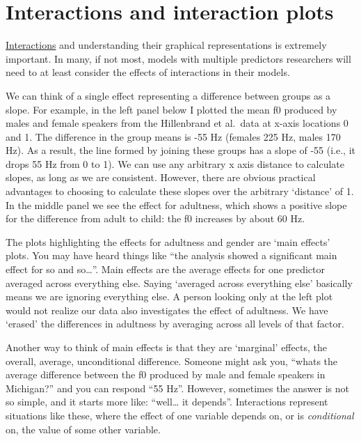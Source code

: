 \documentclass[
]{book}
\begin{document}
\hypertarget{interactions-and-interaction-plots}{%
\section{Interactions and interaction plots}\label{interactions-and-interaction-plots}}

\href{http://glimo.vub.ac.be/downloads/interaction.htm}{Interactions} and understanding their graphical representations is extremely important. In many, if not most, models with multiple predictors researchers will need to at least consider the effects of interactions in their models.

We can think of a single effect representing a difference between groups as a slope. For example, in the left panel below I plotted the mean f0 produced by males and female speakers from the Hillenbrand et al.~data at x-axis locations 0 and 1. The difference in the group means is -55 Hz (females 225 Hz, males 170 Hz). As a result, the line formed by joining these groups has a slope of -55 (i.e., it drops 55 Hz from 0 to 1). We can use any arbitrary x axis distance to calculate slopes, as long as we are consistent. However, there are obvious practical advantages to choosing to calculate these slopes over the arbitrary `distance' of 1. In the middle panel we see the effect for adultness, which shows a positive slope for the difference from adult to child: the f0 increases by about 60 Hz.

The plots highlighting the effects for adultness and gender are `main effects' plots. You may have heard things like ``the analysis showed a significant main effect for so and so\ldots{}''. Main effects are the average effects for one predictor averaged across everything else. Saying `averaged across everything else' basically means we are ignoring everything else. A person looking only at the left plot would not realize our data also investigates the effect of adultness. We have `erased' the differences in adultness by averaging across all levels of that factor.

Another way to think of main effects is that they are `marginal' effects, the overall, average, unconditional difference. Someone might ask you, ``whats the average difference between the f0 produced by male and female speakers in Michigan?'' and you can respond ``55 Hz''. However, sometimes the answer is not so simple, and it starts more like: ``well\ldots{} it depends''. Interactions represent situations like these, where the effect of one variable depends on, or is \emph{conditional} on, the value of some other variable.
\end{document}
